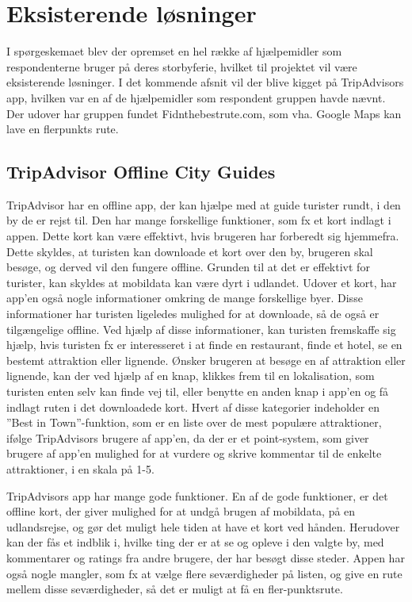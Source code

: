 \section{Eksisterende løsninger}
I spørgeskemaet blev der opremset en hel række af hjælpemidler som respondenterne bruger på deres storbyferie, hvilket til projektet vil være eksisterende løsninger. I det kommende afsnit vil der blive kigget på TripAdvisors app, hvilken var en af de hjælpemidler som respondent gruppen havde nævnt. Der udover har gruppen fundet Fidnthebestrute.com, som vha. Google Maps kan lave en flerpunkts rute.  

\subsection{TripAdvisor Offline City Guides}
TripAdvisor har en offline app, der kan hjælpe med at guide turister rundt, i den by de er rejst til. Den har mange forskellige funktioner, som fx et kort indlagt i appen. Dette kort kan være effektivt, hvis brugeren har forberedt sig hjemmefra. Dette skyldes, at turisten kan downloade et kort over den by, brugeren skal besøge, og derved vil den fungere offline. Grunden til at det er effektivt for turister, kan skyldes at mobildata kan være dyrt i udlandet\citep {TDC}. \newline
Udover et kort, har app'en også nogle informationer omkring de mange forskellige byer. Disse informationer har turisten ligeledes mulighed for at downloade, så de også er tilgængelige offline. Ved hjælp af disse informationer, kan turisten fremskaffe sig hjælp, hvis turisten fx er interesseret i at finde en restaurant, finde et hotel, se en bestemt attraktion eller lignende. Ønsker brugeren at besøge en af attraktion eller lignende, kan der ved hjælp af en knap, klikkes frem til en lokalisation, som turisten enten selv kan finde vej til, eller benytte en anden knap i app'en og få indlagt ruten i det downloadede kort.\newline
Hvert af disse kategorier indeholder en ”Best in Town”-funktion, som er en liste over de mest populære attraktioner, ifølge TripAdvisors brugere af app'en, da der er et point-system, som giver brugere af app'en mulighed for at vurdere og skrive kommentar til de enkelte attraktioner, i en skala på 1-5. \newline

TripAdvisors app har mange gode funktioner. En af de gode funktioner, er det offline kort, der giver mulighed for at undgå brugen af mobildata, på en udlandsrejse, og gør det muligt hele tiden at have et kort ved hånden. Herudover kan der fås et indblik i, hvilke ting der er at se og opleve i den valgte by, med kommentarer og ratings fra andre brugere, der har besøgt disse steder.
Appen har også nogle mangler, som fx at vælge flere seværdigheder på listen, og give en rute mellem disse seværdigheder, så det er muligt at få en fler-punktsrute. \newline
